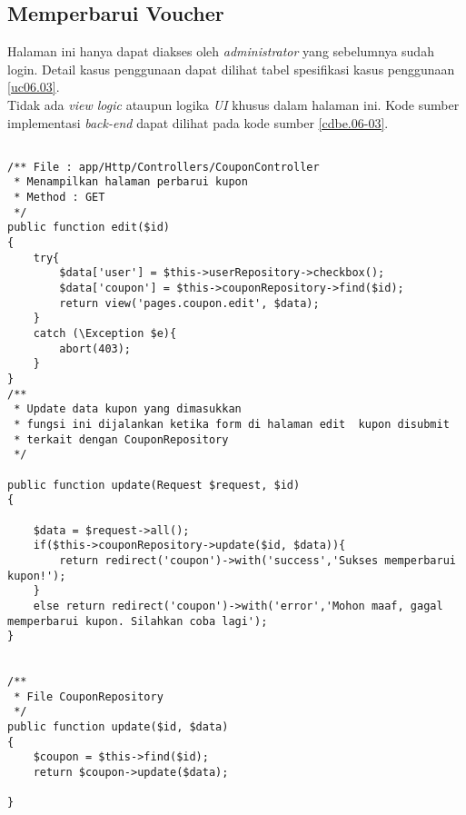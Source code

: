 \subsection{Memperbarui Voucher}
Halaman ini hanya dapat diakses oleh \textit{administrator} yang sebelumnya sudah login. Detail kasus penggunaan dapat dilihat tabel spesifikasi kasus penggunaan \ref{uc06.03}.\\
\indent Tidak ada \textit{view logic} ataupun logika \textit{UI} khusus dalam halaman ini. Kode sumber implementasi \textit{back-end} dapat dilihat pada kode sumber \ref{cdbe.06-03}.

\begin{lstlisting}[label=cdbe.06-03,style=php,caption=Kode Sumber Implementasi \textit{Back-end} Kasus Penggunaan Memperbarui Voucher]

/** File : app/Http/Controllers/CouponController
 * Menampilkan halaman perbarui kupon
 * Method : GET
 */
public function edit($id)
{
    try{
        $data['user'] = $this->userRepository->checkbox();
        $data['coupon'] = $this->couponRepository->find($id);
        return view('pages.coupon.edit', $data);
    }
    catch (\Exception $e){
        abort(403);
    }
}
/**
 * Update data kupon yang dimasukkan
 * fungsi ini dijalankan ketika form di halaman edit  kupon disubmit
 * terkait dengan CouponRepository
 */

public function update(Request $request, $id)
{

    $data = $request->all();
    if($this->couponRepository->update($id, $data)){
        return redirect('coupon')->with('success','Sukses memperbarui kupon!');
    }
    else return redirect('coupon')->with('error','Mohon maaf, gagal memperbarui kupon. Silahkan coba lagi');
}


/**
 * File CouponRepository
 */
public function update($id, $data)
{
    $coupon = $this->find($id);
    return $coupon->update($data);

}
\end{lstlisting}
	  
      
